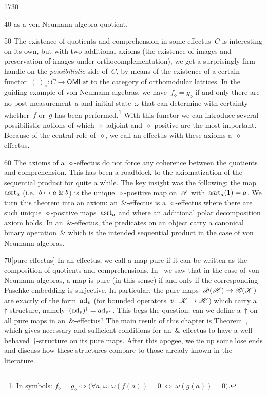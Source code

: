 \begin{parsec}{1730}
\begin{point}{40}
{        as a von Neumann-algebra quotient.}
\end{point}
\begin{point}{50}%
The existence of quotients and comprehension in some effectus~$C$
    is interesting on its own, but with
    two additional axioms (the existence of images and
    preservation of images under orthocomplementation),
    we get a surprisingly firm handle
    on the \emph{possibilistic} side of~$C$,
    by means of the existence
    of a certain functor~$(\ )_\diamond\colon C \to \mathsf{OMLat}$
        to the category of orthomodular lattices.
In the guiding example of von Neumann algebras,
    we have~$f_\diamond = g_\diamond$
        if and only
    there are no post-measurement~$a$ and initial state~$\omega$
    that can determine with certainty
    whether~$f$ or~$g$ has been performed.\footnote{%
    In symbols: $
    f_\diamond = g_\diamond \iff 
\bigl(\forall a,\omega.\  \omega(f(a))  =  0 \ \Leftrightarrow\ \omega(g(a))  =  0\bigr).$}
With this functor we can introduce several
    possibilistic notions of which~$\diamond$-adjoint
    and~$\diamond$-positive are the most important.
Because of the central role of~$\diamond$,
    we call an effectus with these axioms 
    a~$\diamond$-effectus.
\end{point}
\begin{point}{60}%
The axioms of a~$\diamond$-effectus do not force
    any coherence between the quotients and comprehension.
This has been a roadblock to the axiomatization
    of the sequential product for quite a while.
The key insight was the following:
    the map~$\mathrm{asrt}_a$ (i.e.~$b\mapsto a \mathbin{\&} b$)
    is the unique~$\diamond$-positive map on~$\mathscr{A}$
    with~$\mathrm{asrt}_a(1) = a$.
We turn this theorem into an axiom:
    an~$\&$-effectus is
    a~$\diamond$-effectus
    where there are such unique~$\diamond$-positive maps~$\mathrm{asrt}_a$
    and where an additional polar decomposition axiom holds.
In an~$\&$-effectus, the predicates on an object carry a canonical
    binary operation~$\&$
    which is the intended sequential product in
    the case of von Neumann algebras.
\end{point}
\begin{point}{70}[pure-effectus]%
In an effectus, we call a map pure if it can be written
    as the composition of quotients and comprehensions.
In~ we saw that in the case of von Neumann algebras,
    a map is pure (in this sense) if and only if the corresponding Paschke
    embedding is surjective.
In particular, the pure maps~$\mathscr{B}(\mathscr{H}) \to \mathscr{B}(\mathscr{K})$
    are exactly of the form~$\mathrm{ad}_v$
        (for bounded operators~$v\colon \mathscr{K} \to \mathscr{H}$)
    which carry a~$\dagger$-structure,
    namely~$(\mathrm{ad}_v)^\dagger = \mathrm{ad}_{v^*}$.
This begs the question: can we define a~$\dagger$ on all pure maps
    in an~$\&$-effectus?
The main result of this chapter
    is Theorem~,
    which gives  necessary and sufficient conditions
    for an~$\&$-effectus
    to have a well-behaved~$\dagger$-structure on its pure maps.
After this apogee,
    we tie up some lose ends
    and discuss how these
    structures compare to those already known in the literature.
\end{point}
\end{parsec}
